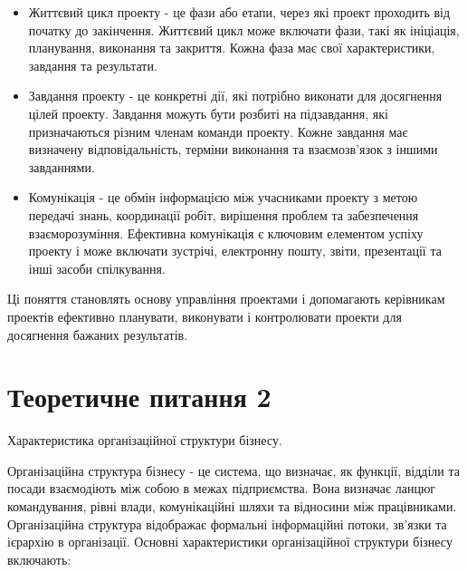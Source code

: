 \documentclass[oneside,14pt]{extarticle}
\begin{document}
\begin{itemize}
	\item Життєвий цикл проекту - це фази або етапи, через які проект проходить від початку до закінчення. Життєвий цикл може включати фази, такі як ініціація, планування, виконання та закриття. Кожна фаза має свої характеристики, завдання та результати.
	\item Завдання проекту - це конкретні дії, які потрібно виконати для досягнення цілей проекту. Завдання можуть бути розбиті на підзавдання, які призначаються різним членам команди проекту. Кожне завдання має визначену відповідальність, терміни виконання та взаємозв'язок з іншими завданнями.
	\item Комунікація - це обмін інформацією між учасниками проекту з метою передачі знань, координації робіт, вирішення проблем та забезпечення взаєморозуміння. Ефективна комунікація є ключовим елементом успіху проекту і може включати зустрічі, електронну пошту, звіти, презентації та інші засоби спілкування.
\end{itemize}

Ці поняття становлять основу управління проектами і допомагають керівникам проектів ефективно планувати, виконувати і контролювати проекти для досягнення бажаних результатів.

\newpage
\section*{Теоретичне питання 2}

Характеристика організаційної структури бізнесу.

Організаційна структура бізнесу - це система, що визначає, як функції, відділи та посади взаємодіють між собою в межах підприємства. Вона визначає ланцюг командування, рівні влади, комунікаційні шляхи та відносини між працівниками. Організаційна структура відображає формальні інформаційні потоки, зв'язки та ієрархію в організації. Основні характеристики організаційної структури бізнесу включають:
\end{document}
